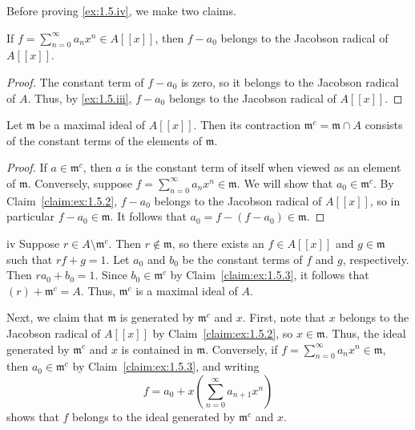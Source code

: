 Before proving \ref{ex:1.5.iv}, we make two claims.

\begin{claim}
\label{claim:ex:1.5.2}
If \(f = \sum_{n=0}^\infty a_n x^n \in A[[x]]\), then \(f - a_0\) belongs to the Jacobson radical of \(A[[x]]\).
\end{claim}

\begin{proof}
The constant term of \(f - a_0\) is zero, so it belongs to the Jacobson radical of \(A\).
Thus, by \ref{ex:1.5.iii}, \(f - a_0\) belongs to the Jacobson radical of \(A[[x]]\).
\end{proof}

\begin{claim}
\label{claim:ex:1.5.3}
Let \(\mathfrak{m}\) be a maximal ideal of \(A[[x]]\).
Then its contraction \(\mathfrak{m}^c = \mathfrak{m} \cap A\) consists of the constant terms of the elements of \(\mathfrak{m}\).
\end{claim}

\begin{proof}
If \(a \in \mathfrak{m}^c\), then \(a\) is the constant term of itself when viewed as an element of \(\mathfrak{m}\).
Conversely, suppose \(f = \sum_{n=0}^\infty a_n x^n \in \mathfrak{m}\).
We will show that \(a_0 \in \mathfrak{m}^c\).
By Claim~\ref{claim:ex:1.5.2}, \(f - a_0\) belongs to the Jacobson radical of \(A[[x]]\), so in particular \(f - a_0 \in \mathfrak{m}\).
It follows that \(a_0 = f - (f - a_0) \in \mathfrak{m}\).
\end{proof}

\begin{partsolution}{1}{5}{iv}
Suppose \(r \in A \setminus \mathfrak{m}^c\).
Then \(r \notin \mathfrak{m}\), so there exists an \(f \in A[[x]]\) and \(g \in \mathfrak{m}\) such that \(r f + g = 1\).
Let \(a_0\) and \(b_0\) be the constant terms of \(f\) and \(g\), respectively.
Then \(r a_0 + b_0 = 1\).
Since \(b_0 \in \mathfrak{m}^c\) by Claim~\ref{claim:ex:1.5.3}, it follows that \((r) + \mathfrak{m}^c = A\).
Thus, \(\mathfrak{m}^c\) is a maximal ideal of \(A\).

Next, we claim that \(\mathfrak{m}\) is generated by \(\mathfrak{m}^c\) and \(x\).
First, note that \(x\) belongs to the Jacobson radical of \(A[[x]]\) by Claim~\ref{claim:ex:1.5.2}, so \(x \in \mathfrak{m}\).
Thus, the ideal generated by \(\mathfrak{m}^c\) and \(x\) is contained in \(\mathfrak{m}\).
Conversely, if \(f = \sum_{n=0}^\infty a_n x^n \in \mathfrak{m}\), then \(a_0 \in \mathfrak{m}^c\) by Claim~\ref{claim:ex:1.5.3}, and writing
\begin{equation*}
f = a_0 + x \left(\sum_{n=0}^\infty a_{n+1} x^n\right)
\end{equation*}
shows that \(f\) belongs to the ideal generated by \(\mathfrak{m}^c\) and \(x\).
\end{partsolution}


